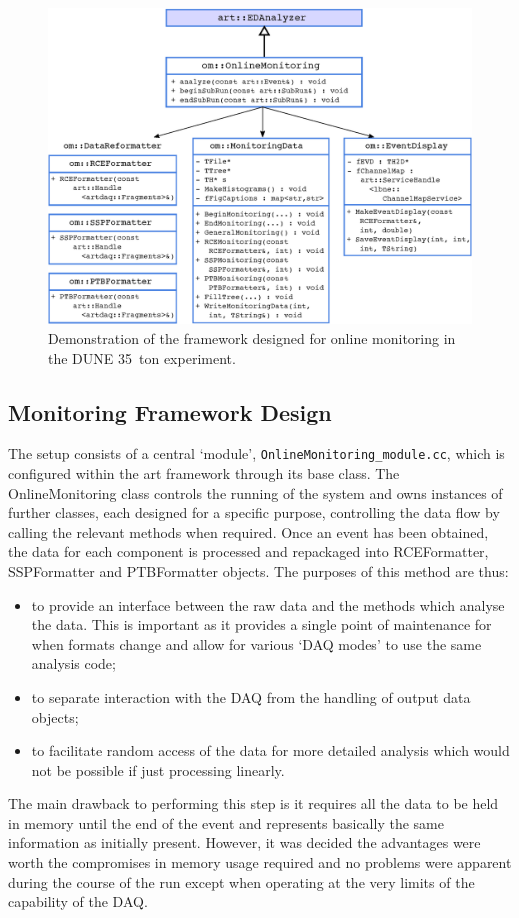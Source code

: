\begin{figure}[ht]
  \centering
  \includegraphics[width=12cm]{softwareFramework.eps}
  \caption[Software framework built for 35~ton Online Monitoring]{Demonstration of the framework designed for online monitoring in the DUNE 35~ton experiment.}
  \label{fig:OnlineMonitoringFramework}
\end{figure}

\subsection{Monitoring Framework Design}\label{sec:MonitoringFrameworkDesign}

The setup consists of a central `module', \texttt{OnlineMonitoring\_module.cc}, which is configured within the art framework through its base class.  The OnlineMonitoring class controls the running of the system and owns instances of further classes, each designed for a specific purpose, controlling the data flow by calling the relevant methods when required.  Once an event has been obtained, the data for each component is processed and repackaged into RCEFormatter, SSPFormatter and PTBFormatter objects.  The purposes of this method are thus:
\begin{itemize}
\item to provide an interface between the raw data and the methods which analyse the data.  This is important as it provides a single point of maintenance for when formats change and allow for various `DAQ modes' to use the same analysis code;
\item to separate interaction with the DAQ from the handling of output data objects;
\item to facilitate random access of the data for more detailed analysis which would not be possible if just processing linearly.
\end{itemize}
The main drawback to performing this step is it requires all the data to be held in memory until the end of the event and represents basically the same information as initially present.  However, it was decided the advantages were worth the compromises in memory usage required and no problems were apparent during the course of the run except when operating at the very limits of the capability of the DAQ.


